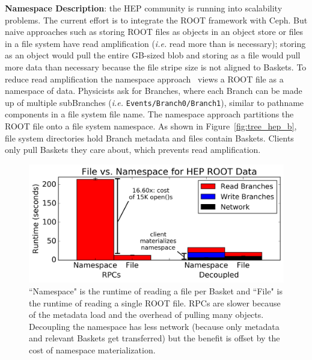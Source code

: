 \textbf{Namespace Description}: the HEP community is running into scalability
problems.  The current effort is to integrate the ROOT framework with Ceph. But
naive approaches such as storing ROOT files as objects in an object store or
files in a file system have read amplification ({\it i.e.} read more than is
necessary); storing as an object would pull the entire GB-sized blob and
storing as a file would pull more data than necessary because the file stripe
size is not aligned to Baskets.  To reduce read amplification the namespace
approach~\cite{pivarski:indico17-root} views a ROOT file as a namespace of
data.  Physicists ask for Branches, where each Branch can be made up of
multiple subBranches ({\it i.e.} \texttt{Events/Branch0/Branch1}), similar to
pathname components in a file system file name. The namespace approach
partitions the ROOT file onto a file system namespace.  As shown in
Figure~\ref{fig:tree_hep_b}, file system directories hold Branch metadata and
files contain Baskets. Clients only pull Baskets they care about, which
prevents read amplification.  


\begin{figure}[tb]
\centering
  \includegraphics[width=1\linewidth]{figures/hep_runtime.png}
  \caption{ ``Namespace" is the runtime of reading a file per Basket and
``File" is the runtime of reading a single ROOT file. RPCs are slower because
of the metadata load and the overhead of pulling many objects.  Decoupling the
namespace has less network (because only metadata and relevant Baskets get
transferred) but the benefit is offset by the cost of namespace
materialization.}\label{fig:hep_runtime}
\end{figure}

